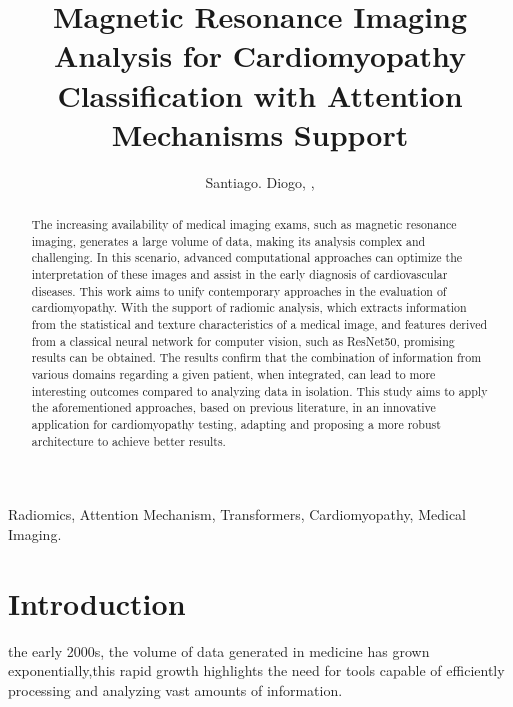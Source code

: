 \documentclass[journal,twoside,web]{ieeecolor}
\begin{document}
\title{Magnetic Resonance Imaging Analysis for Cardiomyopathy Classification with Attention Mechanisms Support}

\author{
   Santiago. Diogo, ,
   
}

\maketitle

\begin{abstract}
The increasing availability of medical imaging exams, such as magnetic resonance imaging, generates a large volume of data, making its analysis complex and challenging. In this scenario, advanced computational approaches can optimize the interpretation of these images and assist in the early diagnosis of cardiovascular diseases. This work aims to unify contemporary approaches in the evaluation of cardiomyopathy. With the support of radiomic analysis, which extracts information from the statistical and texture characteristics of a medical image, and features derived from a classical neural network for computer vision, such as ResNet50, promising results can be obtained. The results confirm that the combination of information from various domains regarding a given patient, when integrated, can lead to more interesting outcomes compared to analyzing data in isolation. This study aims to apply the aforementioned approaches, based on previous literature, in an innovative application for cardiomyopathy testing, adapting and proposing a more robust architecture to achieve better results.
\end{abstract}

\begin{IEEEkeywords}
Radiomics, Attention Mechanism, Transformers, Cardiomyopathy, Medical Imaging.
\end{IEEEkeywords}


\section{Introduction}
\label{sec:introduction}
 the early 2000s, the volume of data generated in medicine has grown exponentially,this rapid growth highlights the need for tools capable of efficiently processing and analyzing vast amounts of information.
\end{document}
